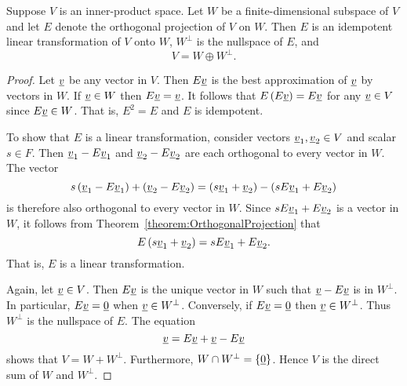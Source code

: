 \begin{theorem} \label{theorem:OrthogonalSubspaceDirectSum}
Suppose $V$ is an inner-product space.
Let $W$ be a finite-dimensional subspace of $V$ and let $E$ denote the orthogonal projection of $V$ on $W$.
Then $E$ is an idempotent linear transformation of $V$ onto $W$, $W^{\bot}$ is the nullspace of $E$, and
\begin{equation*}
V = W \oplus W^{\bot}.
\end{equation*}
\end{theorem}
\begin{proof}
Let $\underline{v}$ be any vector in $V$.
Then $E \underline{v}$ is the best approximation of $\underline{v}$ by vectors in $W$.
If $\underline{v} \in W$ then $E \underline{v} = \underline{v}$.
It follows that $E \left( E \underline{v} \right) = E \underline{v}$ for any $\underline{v} \in V$ since $E \underline{v} \in W$.
That is, $E^2 = E$ and $E$ is idempotent.

To show that $E$ is a linear transformation, consider vectors $\underline{v}_1, \underline{v}_2 \in V$ and scalar $s \in F$.
Then $\underline{v}_1 - E \underline{v}_1$ and $\underline{v}_2 - E \underline{v}_2$ are each orthogonal to every vector in $W$.
The vector
\begin{equation*}
s \left( \underline{v}_1 - E \underline{v}_1 \right) + \left( \underline{v}_2 - E \underline{v}_2 \right) = \left( s \underline{v}_1 + \underline{v}_2 \right) - \left( s E \underline{v}_1 + E \underline{v}_2 \right)
\end{equation*}
is therefore also orthogonal to every vector in $W$.
Since $s E \underline{v}_1 + E \underline{v}_2$ is a vector in $W$, it follows from Theorem~\ref{theorem:OrthogonalProjection} that
\begin{equation*}
E \left( s \underline{v}_1 + \underline{v}_2 \right) = s E \underline{v}_1 + E \underline{v}_2.
\end{equation*}
That is, $E$ is a linear transformation.

Again, let $\underline{v} \in V$.
Then $E \underline{v}$ is the unique vector in $W$ such that $\underline{v} - E \underline{v}$ is in $W^{\bot}$.
In particular, $E \underline{v} = \underline{0}$ when $\underline{v} \in W^{\bot}$.
Conversely, if $E \underline{v} = \underline{0}$ then $\underline{v} \in W^{\bot}$.
Thus $W^{\bot}$ is the nullspace of $E$.
The equation
\begin{equation*}
\underline{v} = E \underline{v} + \underline{v} - E \underline{v}
\end{equation*}
shows that $V = W + W^{\bot}$.
Furthermore, $W \cap W^{\bot} = \left\{ \underline{0} \right\}$.
Hence $V$ is the direct sum of $W$ and $W^{\bot}$.
\end{proof}

